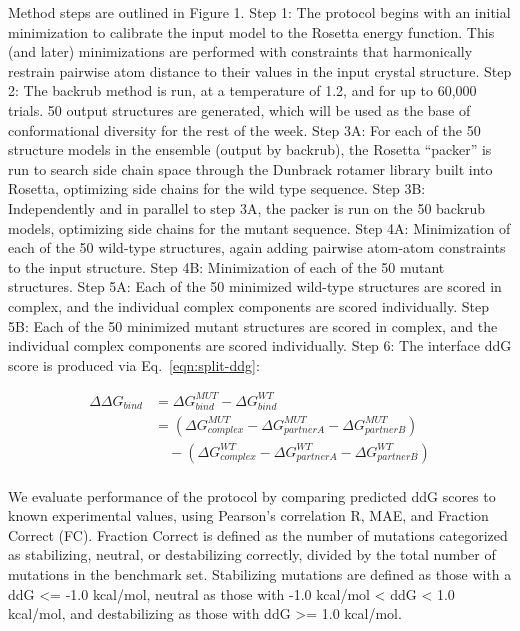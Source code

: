 Method steps are outlined in Figure 1. Step 1: The protocol begins with an initial minimization to calibrate the input model to the Rosetta energy function. This (and later) minimizations are performed with constraints that harmonically restrain pairwise atom distance to their values in the input crystal structure. Step 2: The backrub method is run, at a temperature of 1.2, and for up to 60,000 trials. 50 output structures are generated, which will be used as the base of conformational diversity for the rest of the week. Step 3A: For each of the 50 structure models in the ensemble (output by backrub), the Rosetta ``packer'' is run to search side chain space through the Dunbrack rotamer library built into Rosetta\cite{shapovalov_smoothed_2011}, optimizing side chains for the wild type sequence. Step 3B: Independently and in parallel to step 3A, the packer is run on the 50 backrub models, optimizing side chains for the mutant sequence. Step 4A: Minimization of each of the 50 wild-type structures, again adding pairwise atom-atom constraints to the input structure. Step 4B: Minimization of each of the 50 mutant structures. Step 5A: Each of the 50 minimized wild-type structures are scored in complex, and the individual complex components are scored individually. Step 5B: Each of the 50 minimized mutant structures are scored in complex, and the individual complex components are scored individually. Step 6: The interface ddG score is produced via Eq.~\ref{eqn:split-ddg}:

\begin{equation}\label{eqn:split-ddg}
  \begin{split}
    {\Delta\Delta}G_{bind} & ={\Delta}G^{MUT}_{bind} - {\Delta}G^{WT}_{bind}\\
    & =({\Delta}G^{MUT}_{complex} - {\Delta}G^{MUT}_{partner A} - {\Delta}G^{MUT}_{partner B})\\
    & \quad - ({\Delta}G^{WT}_{complex} - {\Delta}G^{WT}_{partner A} - {\Delta}G^{WT}_{partner B})\\
  \end{split}
\end{equation}

We evaluate performance of the protocol by comparing predicted ddG scores to known experimental values, using Pearson's correlation R, MAE, and Fraction Correct (FC). Fraction Correct is defined as the number of mutations categorized as stabilizing, neutral, or destabilizing correctly, divided by the total number of mutations in the benchmark set. Stabilizing mutations are defined as those with a ddG <= -1.0 kcal/mol, neutral as those with -1.0 kcal/mol < ddG < 1.0 kcal/mol, and destabilizing as those with ddG >= 1.0 kcal/mol.


